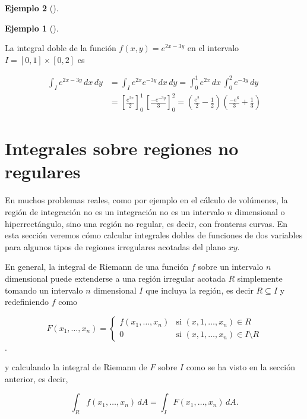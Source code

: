 \documentclass[
  a4paper,
]{scrreport}
\theoremstyle{definition}
\newtheorem{example}{Ejemplo}[chapter]
\theoremstyle{plain}
\theoremstyle{definition}
\theoremstyle{definition}
\theoremstyle{plain}
\theoremstyle{plain}
\theoremstyle{remark}
\begin{document}
\begin{example}[]
\begin{tcolorbox}
\end{tcolorbox}

\begin{example}[]\protect\hypertarget{exm-integral-doble-producto-funciones}{}\label{exm-integral-doble-producto-funciones}

La integral doble de la función \(f(x,y) = e^{2x-3y}\) en el intervalo
\(I=[0,1]\times [0,2]\) es

\begin{align*}
\int_I e^{2x-3y} \,dx\,dy 
&= \int_I e^{2x}e^{-3y} \,dx\,dy
= \int_0^1 e^{2x}\,dx\, \int_0^2 e^{-3y}\,dy \\
&= \left[\frac{e^{2x}}{2}\right]_0^1\, \left[\frac{-e^{-3y}}{3}\right]_0^2 
= \left(\frac{e^2}{2}-\frac{1}{2}\right)\left(\frac{-e^6}{3}+\frac{1}{3}\right) 
\end{align*}

\end{example}

\section{Integrales sobre regiones no
regulares}\label{integrales-sobre-regiones-no-regulares}

En muchos problemas reales, como por ejemplo en el cálculo de volúmenes,
la región de integración no es un integración no es un intervalo \(n\)
dimensional o hiperrectángulo, sino una región no regular, es decir, con
fronteras curvas. En esta sección veremos cómo calcular integrales
dobles de funciones de dos variables para algunos tipos de regiones
irregulares acotadas del plano \(xy\).

En general, la integral de Riemann de una función \(f\) sobre un
intervalo \(n\) dimensional puede extenderse a una región irregular
acotada \(R\) simplemente tomando un intervalo \(n\) dimensional \(I\)
que incluya la región, es decir \(R\subseteq I\) y redefiniendo \(f\)
como

\[
F(x_1,\ldots,x_n) =
\begin{cases}
f(x_1,\ldots,x_n) & \mbox{si $(x,1,\ldots,x_n)\in R$}\\
0 & \mbox{si $(x,1,\ldots,x_n)\in I\setminus R$}
\end{cases}
\].

y calculando la integral de Riemann de \(F\) sobre \(I\) como se ha
visto en la sección anterior, es decir,

\[
\int_{R} f(x_1,\ldots,x_n)\,dA 
= \int_{I} F(x_1,\ldots,x_n)\,dA. 
\]


\end{example}
\end{document}
